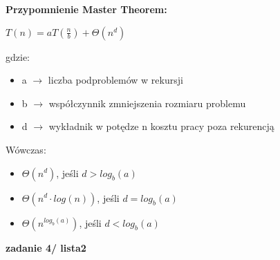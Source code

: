 \documentclass{article}
\begin{document}
    \vspace{1\baselineskip}
    \textbf{Przypomnienie Master Theorem:} \par
    \vspace{1\baselineskip}
    $T(n) = aT(\frac{n}{b}) + \Theta(n^d)$ \par
    gdzie: 
    \begin{itemize}
        \item a $\rightarrow$ liczba podproblemów w rekursji \par
        \item b $\rightarrow$ współczynnik zmniejszenia rozmiaru problemu \par
        \item d $\rightarrow$ wykładnik w potędze n kosztu pracy poza rekurencją \par
    \end{itemize} \par
    Wówczas: \par
    \begin{itemize}
        \item $\Theta(n^d)$, jeśli $d > log_b(a)$ \par
        \item $\Theta(n^d \cdot log(n))$, jeśli $d = log_b(a)$ \par
        \item $\Theta(n^{log_b(a)})$, jeśli $d < log_b(a)$ \par
    \end{itemize} \par
    \vspace{10\baselineskip}
    \textbf{zadanie 4/ lista2} \par
    \vspace{1\baselineskip}
\end{document}
